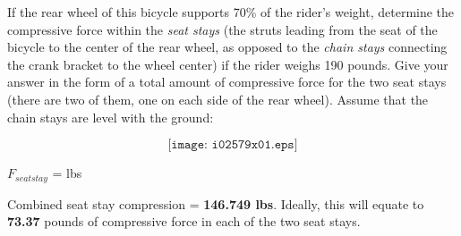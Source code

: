 

If the rear wheel of this bicycle supports 70\% of the rider's weight, determine the compressive force within the {\it seat stays} (the struts leading from the seat of the bicycle to the center of the rear wheel, as opposed to the {\it chain stays} connecting the crank bracket to the wheel center) if the rider weighs 190 pounds.  Give your answer in the form of a total amount of compressive force for the two seat stays (there are two of them, one on each side of the rear wheel).  Assume that the chain stays are level with the ground:

$$\texttt{[image: i02579x01.eps]}$$

$F_{seat stay}$ = \underbar{\hskip 50pt} lbs

\vskip 10pt







Combined seat stay compression = {\bf 146.749 lbs}.  Ideally, this will equate to {\bf 73.37} pounds of compressive force in each of the two seat stays.











